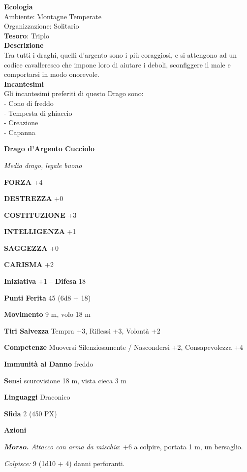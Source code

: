 \begin{multicols}{2}
\textbf{Ecologia}\\
Ambiente: Montagne Temperate\\
Organizzazione: Solitario\\
\textbf{Tesoro}: Triplo\\
\textbf{Descrizione}\\
Tra tutti i draghi, quelli d'argento sono i più coraggiosi, e si attengono ad un codice cavalleresco che impone loro di aiutare i deboli, sconfiggere il male e comportarsi in modo onorevole.\\
\textbf{Incantesimi}\\
Gli incantesimi preferiti di questo Drago sono:\\
- Cono di freddo\\
- Tempesta di ghiaccio\\
- Creazione\\
- Capanna

\medskip{}\textbf{Drago d'Argento Cucciolo}

\textit{Media drago, legale buono}

\textbf{FORZA} +4

\textbf{DESTREZZA} +0

\textbf{COSTITUZIONE} +3

\textbf{INTELLIGENZA} +1

\textbf{SAGGEZZA} +0

\textbf{CARISMA} +2

\textbf{Iniziativa} +1 -- \textbf{Difesa} 18

\textbf{Punti Ferita} 45 (6d8 + 18)

\textbf{Movimento} 9 m, volo 18 m

\textbf{Tiri Salvezza} Tempra +3, Riflessi +3, Volontà +2

\textbf{Competenze} Muoversi Silenziosamente / Nascondersi +2, Consapevolezza +4

\textbf{Immunità al Danno} freddo

\textbf{Sensi} scurovisione 18 m, vista cieca 3 m

\textbf{Linguaggi} Draconico

\textbf{Sfida} 2 (450 PX)

\textbf{Azioni}

\textit{\textbf{Morso.} Attacco con arma da mischia}: +6 a colpire, portata 1 m, un bersaglio.

\textit{Colpisce:} 9 (1d10 + 4) danni perforanti.


\end{multicols}
